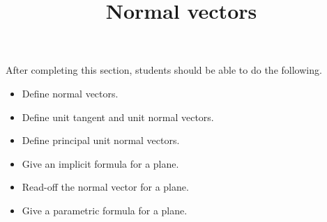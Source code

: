 \documentclass{ximera}
\title{Normal vectors}
\begin{document}
\begin{abstract}
\end{abstract}

\maketitle

\begin{sectionOutcomes}

After completing this section, students should be able to do the following.

\begin{itemize}
\item Define normal vectors.
\item Define unit tangent and unit normal vectors. 
\item Define principal unit normal vectors.
\item Give an implicit formula for a plane. 
\item Read-off the normal vector for a plane.
\item Give a parametric formula for a plane.
\end{itemize}

\end{sectionOutcomes}
\end{document}
